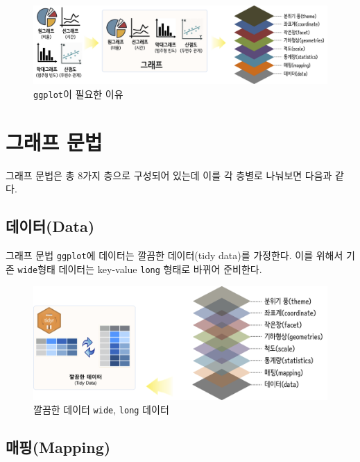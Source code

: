 \documentclass[
]{book}
\begin{document}
\begin{figure}
\centering
\includegraphics[width=1\textwidth,height=\textheight]{assets/images/ggplot_why.png}
\caption{\texttt{ggplot}이 필요한 이유}
\end{figure}

\hypertarget{ggplot2-steps}{%
\section{그래프 문법}\label{ggplot2-steps}}

그래프 문법은 총 8가지 층으로 구성되어 있는데 이를 각 층별로 나눠보면 다음과 같다.

\hypertarget{ggplot2-steps-data}{%
\subsection{데이터(Data)}\label{ggplot2-steps-data}}

그래프 문법 \texttt{ggplot}에 데이터는 깔끔한 데이터(tidy data)를 가정한다. 이를 위해서 기존 \texttt{wide}형태 데이터는 key-value \texttt{long} 형태로 바뀌어 준비한다.

\begin{figure}
\centering
\includegraphics[width=1\textwidth,height=\textheight]{assets/images/ggplot-data.png}
\caption{깔끔한 데이터 \texttt{wide}, \texttt{long} 데이터}
\end{figure}

\hypertarget{ggplot2-steps-mapping}{%
\subsection{매핑(Mapping)}\label{ggplot2-steps-mapping}}
\end{document}
